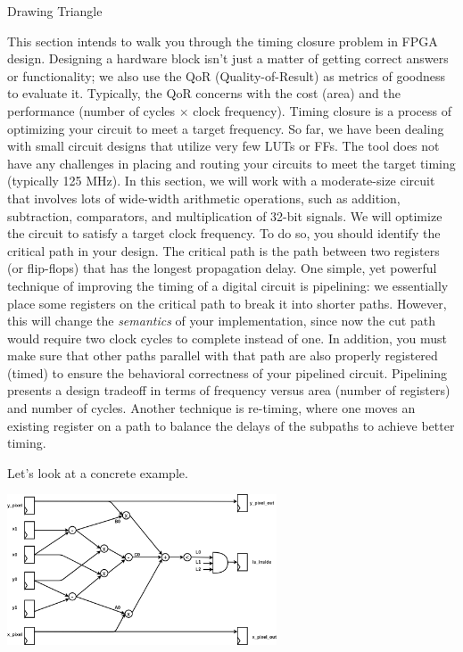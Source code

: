 \documentclass[11pt]{article}
\makeatletter
\renewcommand{\section}
{\@startsection {section}{1}{0pt}
 {-2ex}
 {1ex}
 {\bfseries\Large}}
\makeatother
\begin{document}
\section{Drawing Triangle}

This section intends to walk you through the timing closure problem in FPGA design. Designing a hardware block isn't just a matter of getting correct answers or functionality; we also use the QoR (Quality-of-Result) as metrics of goodness to evaluate it. Typically, the QoR concerns with the cost (area) and the performance (number of cycles $\times$ clock frequency). Timing closure is a process of optimizing your circuit to meet a target frequency. So far, we have been dealing with small circuit designs that utilize very few LUTs or FFs. The tool does not have any challenges in placing and routing your circuits to meet the target timing (typically 125 MHz). In this section, we will work with a moderate-size circuit that involves lots of wide-width arithmetic operations, such as addition, subtraction, comparators, and multiplication of 32-bit signals. We will optimize the circuit to satisfy a target clock frequency. To do so, you should identify the critical path in your design. The critical path is the path between two registers (or flip-flops) that has the longest propagation delay. One simple, yet powerful technique of improving the timing of a digital circuit is pipelining: we essentially place some registers on the critical path to break it into shorter paths. However, this will change the \textit{semantics} of your implementation, since now the cut path would require two clock cycles to complete instead of one. In addition, you must make sure that other paths parallel with that path are also properly registered (timed) to ensure the behavioral correctness of your pipelined circuit. Pipelining presents a design tradeoff in terms of frequency versus area (number of registers) and number of cycles. Another technique is re-timing, where one moves an existing register on a path to balance the delays of the subpaths to achieve better timing.

Let's look at a concrete example.

\begin{center}
\includegraphics[width=0.6\textwidth]{figs/inside_test.png}
\end{center}
\end{document}
